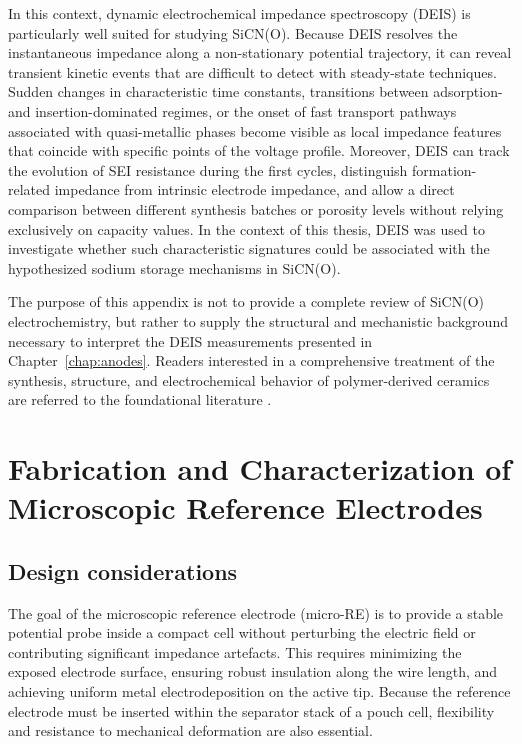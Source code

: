In this context, dynamic electrochemical impedance spectroscopy (DEIS) is particularly well suited for studying SiCN(O). 
Because DEIS resolves the instantaneous impedance along a non-stationary potential trajectory, it can reveal transient kinetic events that are difficult to detect with steady-state techniques.
Sudden changes in characteristic time constants, transitions between adsorption- and insertion-dominated regimes, or the onset of fast transport pathways associated with quasi-metallic phases become visible as local impedance features that coincide with specific points of the voltage profile. 
Moreover, DEIS can track the evolution of SEI resistance during the first cycles, distinguish formation-related impedance from intrinsic electrode impedance, and allow a direct comparison between different synthesis batches or porosity levels without relying exclusively on capacity values. 
In the context of this thesis, DEIS was used to investigate whether such characteristic signatures could be associated with the hypothesized sodium storage mechanisms in SiCN(O).

The purpose of this appendix is not to provide a complete review of SiCN(O) electrochemistry, but rather to supply the structural and mechanistic background necessary to interpret the DEIS measurements presented in Chapter~\ref{chap:anodes}. 
Readers interested in a comprehensive treatment of the synthesis, structure, and electrochemical behavior of polymer-derived ceramics are referred to the foundational literature \cite{REINOLD2013224,chengHighThermalConductivity2022,chengElectricalCharacteristicsReliability2021}.

\chapter{Fabrication and Characterization of Microscopic Reference Electrodes}
\label{app:microRE}

\section{Design considerations}

The goal of the microscopic reference electrode (micro-RE) is to provide a stable potential probe inside a compact cell without perturbing the electric field or contributing significant impedance artefacts.  
This requires minimizing the exposed electrode surface, ensuring robust insulation along the wire length, and achieving uniform metal electrodeposition on the active tip.  
Because the reference electrode must be inserted within the separator stack of a pouch cell, flexibility and resistance to mechanical deformation are also essential.

